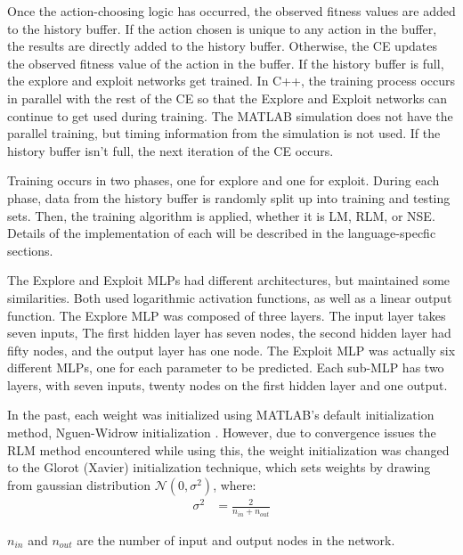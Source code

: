 \par Once the action-choosing logic has occurred, the observed fitness values are added to the history buffer. If the action chosen is unique to any action in the buffer, the results are directly added to the history buffer. Otherwise, the CE updates the observed fitness value of the action in the buffer. If the history buffer is full, the explore and exploit networks get trained. In C++, the training process occurs in parallel with the rest of the CE so that the Explore and Exploit networks can continue to get used during training. The MATLAB simulation does not have the parallel training, but timing information from the simulation is not used. If the history buffer isn't full, the next iteration of the CE occurs.
\par Training occurs in two phases, one for explore and one for exploit. During each phase, data from the history buffer is randomly split up into training and testing sets. Then, the training algorithm is applied, whether it is LM, RLM, or NSE. Details of the implementation of each will be described in the language-specfic sections. 
\par The Explore and Exploit MLPs had different architectures, but maintained some similarities. Both used logarithmic activation functions, as well as a linear output function. The Explore MLP was composed of three layers. The input layer takes seven inputs, The first hidden layer has seven nodes, the second hidden layer had fifty nodes, and the output layer has one node. The Exploit MLP was actually six different MLPs, one for each parameter to be predicted. Each sub-MLP has two layers, with seven  inputs, twenty nodes on the first hidden layer and one output. 
\par In the past, each weight was initialized using MATLAB's default initialization method, Nguen-Widrow initialization \cite{placeholderCitation}. However, due to convergence issues the RLM method encountered while using this, the weight initialization was changed to the Glorot (Xavier) initialization technique\cite{glorot_training}, which sets weights by drawing from gaussian distribution $\mathcal{N}(0,\sigma^2)$, where:
\begin{align*}
	\sigma^2 &= \frac{2}{n_{in}+n_{out}}
\end{align*} 
\par $n_{in}$ and $n_{out}$ are the number of input and output nodes in the network.
